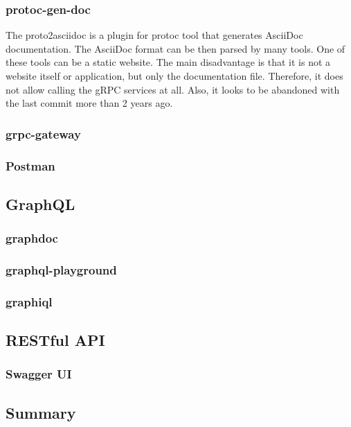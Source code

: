 \subsubsection{protoc-gen-doc}
The proto2asciidoc is a plugin for protoc tool that generates AsciiDoc documentation.
The AsciiDoc format can be then parsed by many tools.
One of these tools can be a static website.
The main disadvantage is that it is not a website itself or application, but only the documentation file.
Therefore, it does not allow calling the gRPC services at all.
Also, it looks to be abandoned with the last commit more than 2 years ago.
\cite{grpc-protoc-gen-doc}

\subsubsection{grpc-gateway}

\subsubsection{Postman}

\subsection{GraphQL}

\subsubsection{graphdoc}

\subsubsection{graphql-playground}

\subsubsection{graphiql}

\subsection{RESTful API}

\subsubsection{Swagger UI}

\subsection{Summary}

